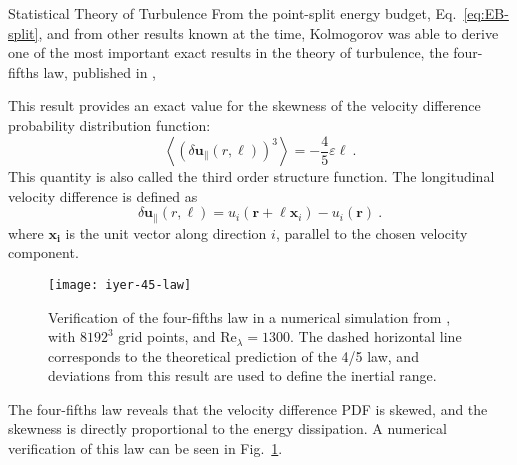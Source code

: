 \begin{chapter}{Statistical Theory of Turbulence}
From the point-split energy budget, Eq.~\eqref{eq:EB-split},
and from other results known at the time, Kolmogorov was able
to derive one of the most important exact results in the
theory of turbulence, the four-fifths law,
published in \textcite{kolmogorov1941dissipation},

This result provides an exact value for the skewness
of the velocity difference probability distribution function:
\begin{equation} \label{eq:45law}
	\left\langle\left(\delta \bm{u}_{ \|}(r, \ell)\right)^{3}
	\right\rangle=-\frac{4}{5} \varepsilon \ell \ .
\end{equation}
This quantity is also called the third order structure function.
The longitudinal velocity difference is defined as
\begin{equation}
	\delta \bm{u}_{ \|}(r, \ell) = u_i(\bm{r}+\ell \bm{x}_i) - u_i(\bm{r}) \ .
\end{equation}
where $\bm{x_i}$ is the unit vector along direction $i$,
parallel to the chosen velocity component.

\begin{figure}[ht]
	\centering
	\texttt{[image: iyer-45-law]}
	\caption[Numerical verification of the four-fifths law]
	{Verification of the four-fifths law in a numerical
	simulation from \textcite{iyer2017reynolds}, with $8192^3$ grid points, and $\mathrm{Re}_{\lambda} = 1300$. The dashed horizontal line corresponds to the theoretical prediction of the 4/5 law, and deviations from this result are used to define the inertial range.}
	\label{fig:k-45-law}
\end{figure}

The four-fifths law reveals that the velocity difference PDF is skewed,
and the skewness is directly proportional to the energy dissipation.
A numerical verification of this law can be seen in
Fig.~\ref{fig:k-45-law}.


\end{chapter}
